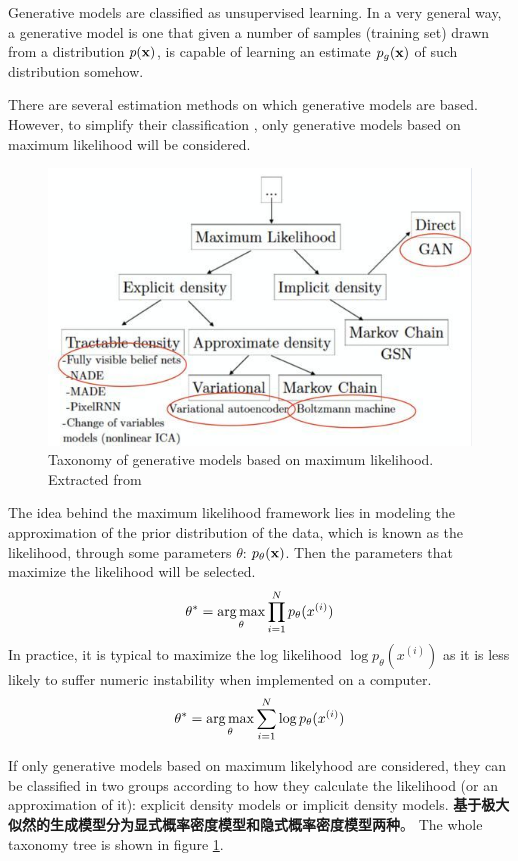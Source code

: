 Generative models are classified as unsupervised learning. In a very general way, a
generative model is one that given a number of samples (training set) drawn from a 
distribution $p(\mathbf{x})$, is capable of learning an estimate $p_g(\mathbf{x})$ of such distribution 
somehow.

There are several estimation methods on which generative models are based. However, to 
simplify their classification \cite{Goodfellow2016}, only generative models based on 
maximum likelihood will be considered.

\begin{figure}[H]
\centering
\includegraphics[scale=0.618]{pix/dgm/taxonomy_goodfellow.jpeg}
\caption{Taxonomy of generative models based on maximum likelihood. Extracted from \cite{Goodfellow2016}}
\label{fig:taxonomy_generative_models}
\end{figure}

The idea behind the maximum likelihood framework lies in modeling the approximation of 
the prior distribution of the data, which is known as the likelihood, through some 
parameters $\theta$: $p_\theta(\mathbf{x})$. Then the parameters that maximize the likelihood 
will be selected.
\begin{align}
\theta^* = \operatorname*{arg\,max}_\theta \prod_{i=1}^N p_\theta(x^{(i)})
\end{align}
In practice, it is typical to maximize the log likelihood $\log p_\theta(x^{(i)})$ as 
it is less likely to suffer numeric instability when implemented on a computer.
\begin{align}
\theta^* = \operatorname*{arg\,max}_\theta \sum_{i=1}^N \log p_\theta(x^{(i)})
\end{align}

If only generative models based on maximum likelyhood are considered, they can be 
classified in two groups according to how they calculate the likelihood (or an 
approximation of it): explicit density models or implicit density models. 
{\bf 基于极大似然的生成模型分为显式概率密度模型和隐式概率密度模型两种}。
The whole taxonomy tree is shown in figure \ref{fig:taxonomy_generative_models}.

